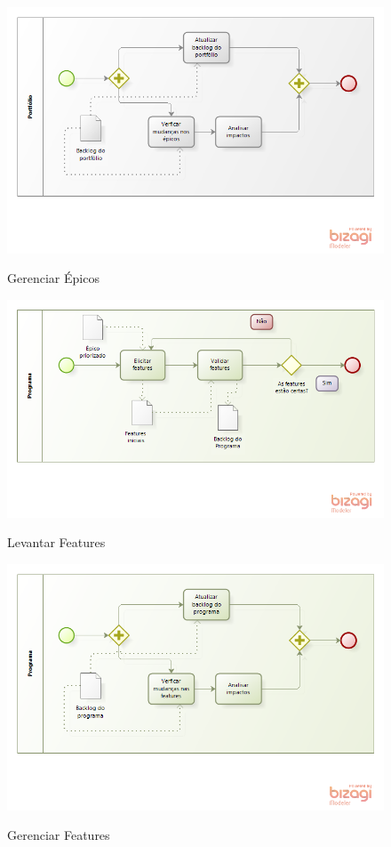 \FloatBarrier
\begin{figure}[!htpd]
		\centering
		\includegraphics[scale=0.7]{figuras/epicosGRE}
		\label{img:time}
		\caption{Gerenciar Épicos}
\end{figure}
\FloatBarrier

\FloatBarrier
\begin{figure}[!htpd]
		\centering
		\includegraphics[scale=0.7]{figuras/FeaturesPRI}
		\label{img:time}
		\caption{Levantar Features}
\end{figure}
\FloatBarrier

\FloatBarrier
\begin{figure}[!htpd]
		\centering
		\includegraphics[scale=0.7]{figuras/featureGRE}
		\label{img:time}
		\caption{Gerenciar Features}
\end{figure}
\FloatBarrier

